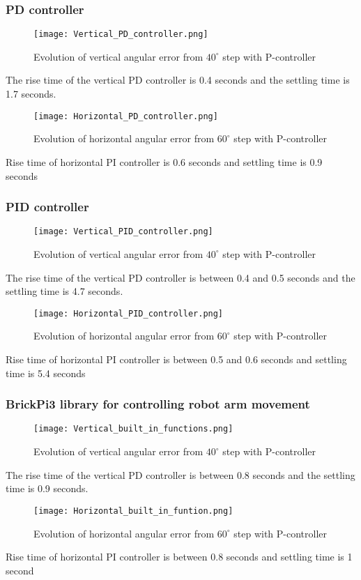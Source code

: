 \subsubsection{PD controller}
\begin{figure}[H]
\centering
\texttt{[image: Vertical\_PD\_controller.png]}
\caption{Evolution of vertical angular error from \(40^{\circ}\) step with P-controller}
\label{vert_P}
\end{figure}
The rise time of the vertical PD controller is 0.4 seconds and the settling time is 1.7 seconds.
\begin{figure}[H]
\centering
\texttt{[image: Horizontal\_PD\_controller.png]}
\caption{Evolution of horizontal angular error from \(60^{\circ}\) step with P-controller}
\label{vert_P}
\end{figure}
Rise time of horizontal PI controller is 0.6 seconds and settling time is 0.9 seconds

\subsubsection{PID controller}
\begin{figure}[H]
\centering
\texttt{[image: Vertical\_PID\_controller.png]}
\caption{Evolution of vertical angular error from \(40^{\circ}\) step with P-controller}
\label{vert_P}
\end{figure}
The rise time of the vertical PD controller is between 0.4 and 0.5 seconds and the settling time is 4.7 seconds.
\begin{figure}[H]
\centering
\texttt{[image: Horizontal\_PID\_controller.png]}
\caption{Evolution of horizontal angular error from \(60^{\circ}\) step with P-controller}
\label{vert_P}
\end{figure}
Rise time of horizontal PI controller is between 0.5 and 0.6 seconds and settling time is 5.4 seconds

\subsubsection{BrickPi3 library for controlling robot arm movement}
\begin{figure}[H]
\centering
\texttt{[image: Vertical\_built\_in\_functions.png]}
\caption{Evolution of vertical angular error from \(40^{\circ}\) step with P-controller}
\label{vert_P}
\end{figure}
The rise time of the vertical PD controller is between 0.8 seconds and the settling time is 0.9 seconds.
\begin{figure}[H]
\centering
\texttt{[image: Horizontal\_built\_in\_funtion.png]}
\caption{Evolution of horizontal angular error from \(60^{\circ}\) step with P-controller}
\label{vert_P}
\end{figure}
Rise time of horizontal PI controller is between 0.8 seconds and settling time is 1 second

